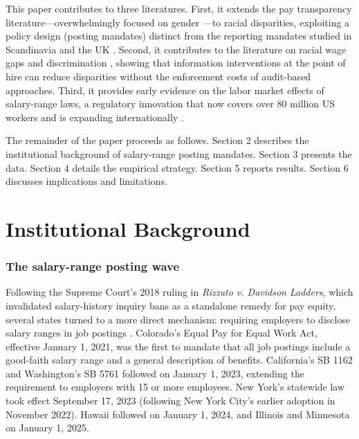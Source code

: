 \documentclass[12pt]{article}
\begin{document}
This paper contributes to three literatures. First, it extends the pay transparency literature---overwhelmingly focused on gender \citep{bennedsen2022firms, baker2023pay, duchini2024pay, cullen2024equilibrium}---to racial disparities, exploiting a policy design (posting mandates) distinct from the reporting mandates studied in Scandinavia and the UK \citep{gulyas2023does}. Second, it contributes to the literature on racial wage gaps and discrimination \citep{lang2020race, kline2022systemic, arnold2022measuring}, showing that information interventions at the point of hire can reduce disparities without the enforcement costs of audit-based approaches. Third, it provides early evidence on the labor market effects of salary-range laws, a regulatory innovation that now covers over 80 million US workers and is expanding internationally \citep{eu2023pay}.

The remainder of the paper proceeds as follows. Section 2 describes the institutional background of salary-range posting mandates. Section 3 presents the data. Section 4 details the empirical strategy. Section 5 reports results. Section 6 discusses implications and limitations.

\section{Institutional Background}

\subsubsection*{The salary-range posting wave} Following the Supreme Court's 2018 ruling in \textit{Rizzuto v. Davidson Ladders}, which invalidated salary-history inquiry bans as a standalone remedy for pay equity, several states turned to a more direct mechanism: requiring employers to disclose salary ranges in job postings \citep{barach2021steering}. Colorado's Equal Pay for Equal Work Act, effective January 1, 2021, was the first to mandate that all job postings include a good-faith salary range and a general description of benefits. California's SB 1162 and Washington's SB 5761 followed on January 1, 2023, extending the requirement to employers with 15 or more employees. New York's statewide law took effect September 17, 2023 (following New York City's earlier adoption in November 2022). Hawaii followed on January 1, 2024, and Illinois and Minnesota on January 1, 2025.
\end{document}
